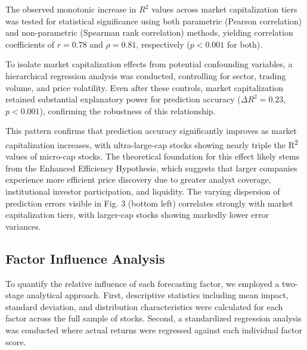 \documentclass[3p,times,procedia]{elsarticle}
\begin{document}
\begin{table}[!ht]
\centering
\caption{\textbf{Market Capitalization Impact on Prediction Accuracy}}
\end{table}






The observed monotonic increase in $R^2$ values across market capitalization tiers was tested for statistical significance using both parametric (Pearson correlation) and non-parametric (Spearman rank correlation) methods, yielding correlation coefficients of $r = 0.78$ and $\rho = 0.81$, respectively ($p < 0.001$ for both).

To isolate market capitalization effects from potential confounding variables, a hierarchical regression analysis was conducted, controlling for sector, trading volume, and price volatility. Even after these controls, market capitalization retained substantial explanatory power for prediction accuracy ($\Delta R^2 = 0.23$, $p < 0.001$), confirming the robustness of this relationship.


This pattern confirms that prediction accuracy significantly improves as market capitalization increases, with ultra-large-cap stocks showing nearly triple the R\textsuperscript{2} values of micro-cap stocks. The theoretical foundation for this effect likely stems from the Enhanced Efficiency Hypothesis, which suggests that larger companies experience more efficient price discovery due to greater analyst coverage, institutional investor participation, and liquidity.
The varying dispersion of prediction errors visible in Fig. 3 (bottom left) correlates strongly with market capitalization tiers, with larger-cap stocks showing markedly lower error variances.

\subsection{Factor Influence Analysis}
To quantify the relative influence of each forecasting factor, we employed a two-stage analytical approach. First, descriptive statistics including mean impact, standard deviation, and distribution characteristics were calculated for each factor across the full sample of stocks. Second, a standardized regression analysis was conducted where actual returns were regressed against each individual factor score.
\end{document}
